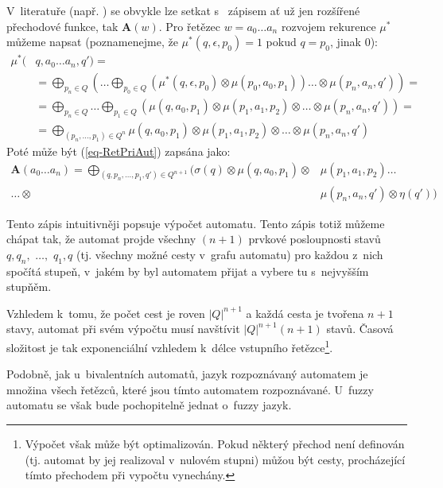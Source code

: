 \begin{note}
  V~literatuře (např. \cite{SebJoh-InvFuzzAutInvFuzzLang, IgnCirBog-DetFuzAutMemValComResLat, Bel-DetFuzAut}) se obvykle lze setkat s~ zápisem ať už jen rozšířené přechodové funkce, tak $\mathbf{A}(w)$. Pro řetězec $w = a_0 \dots a_n$ rozvojem rekurence $\mu^*$ můžeme napsat (poznamenejme, že $\mu^*(q, \epsilon, p_0) = 1$ pokud $q = p_0$, jinak $0$):
  \begin{align*}
   \mu^*(& q, a_0 \dots a_n, q') = \\
    &= \bigoplus_{p_n \in Q} \left( \dots \bigoplus_{p_0 \in Q} (\mu^*(q, \epsilon, p_0) \otimes \mu(p_0, a_0, p_1)) \dots \otimes \mu(p_n, a_n, q') \right) = \\
    &= \bigoplus_{p_n \in Q} \dots \bigoplus_{p_1 \in Q} \left( \mu(q, a_0, p_1) \otimes \mu(p_1, a_1, p_2) \otimes \dots \otimes \mu(p_n, a_n, q') \right) = \\
    &= \bigoplus_{(p_n,\dots, p_1) \in Q^n} \mu(q, a_0, p_1) \otimes \mu(p_1, a_1, p_2) \otimes \dots \otimes \mu(p_n, a_n, q')
  \end{align*}
  Poté může být (\ref{eq-RetPriAut}) zapsána jako:
  \begin{align*}
    \mathbf{A}(a_0 \dots a_n) 
    = \bigoplus_{(q, p_n,\dots, p_1, q') \in Q^{n+1}} (\sigma(q) \otimes \mu(q, a_0, p_1) \otimes &\mu(p_1, a_1, p_2) \dots \\
     \dots \otimes &\mu(p_n, a_n, q') \otimes \eta(q'))
  \end{align*}

  Tento zápis intuitivněji popsuje výpočet automatu. Tento zápis totiž můžeme chápat tak, že automat projde všechny $(n+1)$ prvkové posloupnosti stavů $q, q_n,$ $\dots,$ $q_1, q$ (tj. všechny možné cesty v~grafu automatu) pro každou z~nich spočítá stupeň, v~jakém by byl automatem přijat a vybere tu s~nejvyšším stupňěm.
  
  Vzhledem k~tomu, že počet cest je roven $|Q|^{n+1}$ a každá cesta je tvořena $n+1$ stavy, automat při svém výpočtu musí navštívit $|Q|^{n+1}(n+1)$ stavů. Časová složitost je tak exponenciální vzhledem k~délce vstupního řetězce\footnote{Výpočet však může být optimalizován. Pokud některý přechod není definován (tj. automat by jej realizoval v~nulovém stupni) můžou být cesty, procházející tímto přechodem při vypočtu vynechány.}.
\end{note}

Podobně, jak u~bivalentních automatů, jazyk rozpoznávaný automatem je množina všech řetězců, které jsou tímto automatem rozpoznávané. U~fuzzy automatu se však bude pochopitelně jednat o~fuzzy jazyk.

